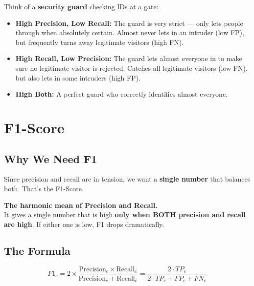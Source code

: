 \documentclass[12pt, a4paper]{article}
\begin{document}
\begin{intuitionbox}
Think of a \textbf{security guard} checking IDs at a gate:

\begin{itemize}[itemsep=0.3cm]
    \item \textbf{High Precision, Low Recall:} The guard is very strict --- only lets people through when absolutely certain. Almost never lets in an intruder (low FP), but frequently turns away legitimate visitors (high FN).
    \item \textbf{High Recall, Low Precision:} The guard lets almost everyone in to make sure no legitimate visitor is rejected. Catches all legitimate visitors (low FN), but also lets in some intruders (high FP).
    \item \textbf{High Both:} A perfect guard who correctly identifies almost everyone.
\end{itemize}
\end{intuitionbox}


\newpage
\section{F1-Score}

\subsection{Why We Need F1}

Since precision and recall are in tension, we want a \textbf{single number} that balances both. That's the F1-Score.

\begin{keyidea}
\textbf{The harmonic mean of Precision and Recall.}\\[0.3cm]
It gives a single number that is high \textbf{only when BOTH precision and recall are high}. If either one is low, F1 drops dramatically.
\end{keyidea}

\subsection{The Formula}

\begin{formulabox}
\[
\boxed{F1_c = 2 \times \frac{\text{Precision}_c \times \text{Recall}_c}{\text{Precision}_c + \text{Recall}_c} = \frac{2 \cdot TP_c}{2 \cdot TP_c + FP_c + FN_c}}
\]
\end{formulabox}
\end{document}
